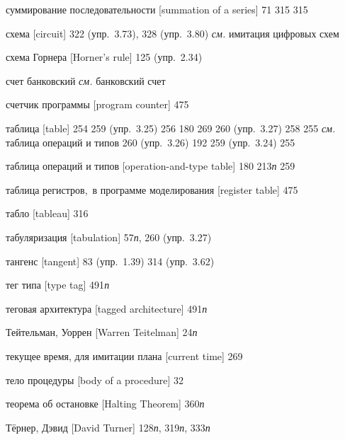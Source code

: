 \begin{theindex}
\item {суммирование последовательности [summation of a series]} 71
   315
   315
\item {схема [circuit]}
   322 (упр.~3.73), 328 (упр.~3.80)
   {\it см.} имитация цифровых схем
\item {схема Горнера [Horner's rule]} 125 (упр.~2.34)
\item {счет банковский} {\it см.} банковский счет
\item {счетчик программы [program counter]} 475
\bigskip
\item {таблица [table]} 254
   259 (упр.~3.25)
   256
   180
   269
   260 (упр.~3.27)
   258
   255
   {\it см.} таблица операций и типов
   260 (упр.~3.26)
   192
   259 (упр.~3.24)
   255
\item {таблица операций и типов [operation-and-type table]} 180
   213{\it п}
   259
\item {таблица регистров,~в программе моделирования [register table]} 475
\item {табло [tableau]} 316
\item {табуляризация [tabulation]} 57{\it п}, 260 (упр.~3.27)
\item {тангенс [tangent]}
   83 (упр.~1.39)
   314 (упр.~3.62)
\item {тег типа [type tag]} 491{\it п}
\item {теговая архитектура [tagged architecture]} 491{\it п}
\item {Тейтельман, Уоррен [Warren Teitelman]} 24{\it п}
\item {текущее время, для имитации плана [current time]} 269
\item {тело процедуры [body of a procedure]} 32
\item {теорема об остановке [Halting Theorem]} 360{\it п}
\item {Т\"ернер, Дэвид [David Turner]} 128{\it п}, 319{\it п}, 333{\it п}

\end{theindex}
